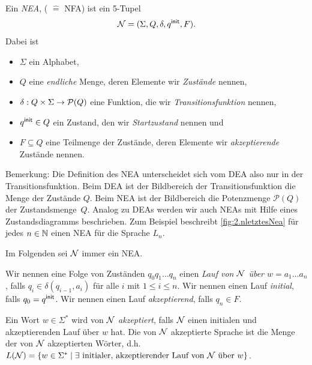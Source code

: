 \begin{Def}
        Ein \emph{\acf{NEA}}, ( $\hat=$ \acl{NFA}) ist ein 5-Tupel
        \[ \mathcal{N}= (\Sigma, Q,\delta,q^\mathsf{init},F). \]
Dabei ist
        \begin{itemize}
                \item $\Sigma$ ein Alphabet,
                \item $Q$ eine \emph{endliche} Menge, deren Elemente wir \emph{Zustände} nennen,
                \item $\delta:Q\x\Sigma\->\mathcal{P}(Q)$ eine Funktion, die wir \emph{Transitionsfunktion} nennen,
                \item $q^\mathsf{init}\in Q$ ein Zustand, den wir \emph{Startzustand} nennen und
                \item $F\subseteq Q$ eine Teilmenge der Zustände, deren Elemente wir \emph{akzeptierende} Zustände nennen.
                \qedhere
        \end{itemize}
\end{Def}
Bemerkung: Die Definition des \acs*{NEA} unterscheidet sich vom \acs*{DEA} also nur in der Transitionsfunktion. Beim \acs*{DEA} ist der Bildbereich der Transitionsfunktion die Menge der Zustände $Q$. Beim \acs*{NEA} ist der Bildbereich die Potenzmenge $\mathcal{P}(Q)$ der Zustandsmenge~$Q$.
Analog zu \acs*{DEA}s werden wir auch \acs*{NEA}s mit Hilfe eines Zustandsdiagramms beschrieben. Zum Beispiel beschreibt \autoref{fig:2.nletztesNea} für jedes $n\in\mathbb{N}$ einen \acs*{NEA} für die Sprache $L_n$.

Im Folgenden sei $\mathcal{N}$ immer ein \acs*{NEA}.
\begin{Def}[name={[Lauf eines Automaten]}]
	Wir nennen eine Folge von Zuständen $q_0q_1\dots q_n$ einen \emph{Lauf von $\mathcal{N}$ über $w=a_1\dots a_n$}, falls
	$q_i\in\delta(q_{i-1},a_i)$ für alle $i$ mit $1\leq i\leq n$.
	Wir nennen einen Lauf \emph{initial}, falls $q_0=q^\mathsf{init}$.
	Wir nennen einen Lauf \emph{akzeptierend}, falls $q_n\in F$.
\end{Def}
\begin{Def}[name={[NEA zu DEA]}]
	Ein Wort $w\in\Sigma^*$ wird von $\mathcal{N}$ \emph{akzeptiert}, falls $\mathcal{N}$ einen initialen und akzeptierenden Lauf über $w$ hat.
	Die von $\mathcal{N}$ akzeptierte Sprache ist die Menge der von $\mathcal{N}$ akzeptierten Wörter, d.h.\
	$L(\mathcal{N})=\{ w\in\Sigma^* \mid \exists\text{ initialer, akzeptierender Lauf von $\mathcal{N}$ über }w \}$.
\end{Def}




